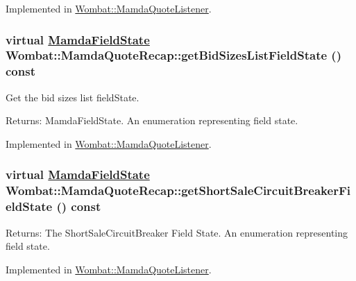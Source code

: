 Implemented in \hyperlink{classWombat_1_1MamdaQuoteListener_b943a6dc805ddb2d213d60539538d290}{Wombat::Mamda\-Quote\-Listener}.\hypertarget{classWombat_1_1MamdaQuoteRecap_8f599613010d229d59ab812227aa3373}{
\subsubsection[getBidSizesListFieldState]{\setlength{\rightskip}{0pt plus 5cm}virtual \hyperlink{namespaceWombat_93aac974f2ab713554fd12a1fa3b7d2a}{Mamda\-Field\-State} Wombat::Mamda\-Quote\-Recap::get\-Bid\-Sizes\-List\-Field\-State () const}}
\label{classWombat_1_1MamdaQuoteRecap_8f599613010d229d59ab812227aa3373}


Get the bid sizes list field\-State. 

\begin{Desc}
\item[Returns:]Mamda\-Field\-State. An enumeration representing field state. \end{Desc}


Implemented in \hyperlink{classWombat_1_1MamdaQuoteListener_1b8e1f6e95a20180b0f69df8fb9fdced}{Wombat::Mamda\-Quote\-Listener}.\hypertarget{classWombat_1_1MamdaQuoteRecap_d36a516b29285e3f16b488fbe7e5ba1a}{
\subsubsection[getShortSaleCircuitBreakerFieldState]{\setlength{\rightskip}{0pt plus 5cm}virtual \hyperlink{namespaceWombat_93aac974f2ab713554fd12a1fa3b7d2a}{Mamda\-Field\-State} Wombat::Mamda\-Quote\-Recap::get\-Short\-Sale\-Circuit\-Breaker\-Field\-State () const}}
\label{classWombat_1_1MamdaQuoteRecap_d36a516b29285e3f16b488fbe7e5ba1a}


\begin{Desc}
\item[Returns:]The Short\-Sale\-Circuit\-Breaker Field State. An enumeration representing field state. \end{Desc}


Implemented in \hyperlink{classWombat_1_1MamdaQuoteListener_741a0cdce0ceb5247ec54a883b265374}{Wombat::Mamda\-Quote\-Listener}.